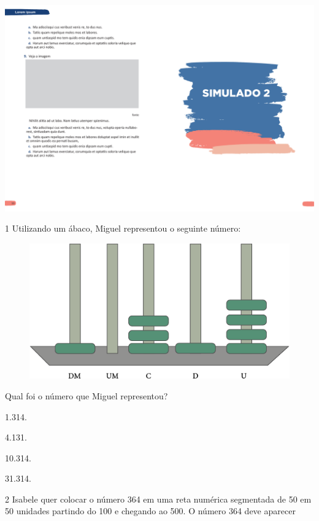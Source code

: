 \vspace*{-3.4cm}
\hspace*{-3.7cm}\includegraphics[scale=1]{../watermarks/2simulado5ano.pdf}

\num{1} Utilizando um ábaco, Miguel representou o seguinte número:

\begin{figure}[htpb!]
\centering
\includegraphics[width=\textwidth]{media/image80.png}
\end{figure}

Qual foi o número que Miguel representou?

\begin{escolha}
\item
  1.314.
\item
  4.131.
\item
  10.314.
\item
  31.314.
\end{escolha}

\num{2} Isabele quer colocar o número 364 em uma reta numérica segmentada de 50 em 50 unidades partindo do 100 e chegando ao 500. O número 364 deve aparecer

